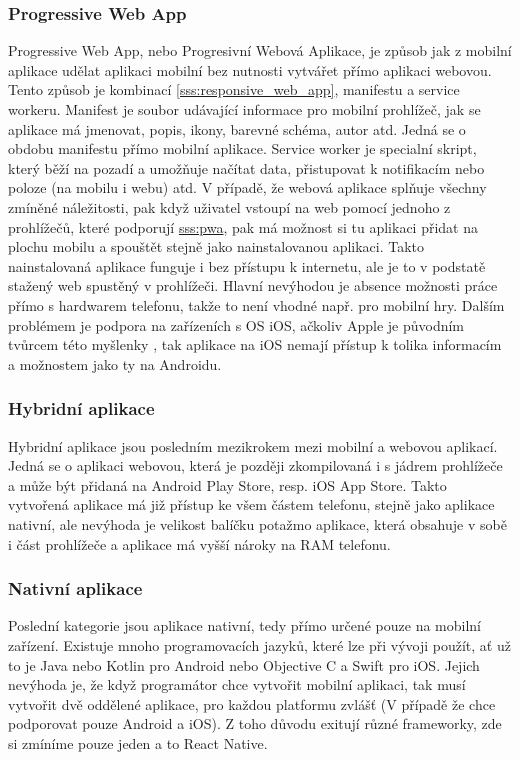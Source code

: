 \subsubsection*{Progressive Web App}
\label{sss:pwa}
Progressive Web App, nebo Progresivní Webová Aplikace, je způsob jak z mobilní aplikace udělat aplikaci mobilní bez nutnosti vytvářet přímo aplikaci webovou. Tento způsob je kombinací \ref{sss:responsive_web_app}, manifestu a service workeru. Manifest je soubor udávající informace pro mobilní prohlížeč, jak se aplikace má jmenovat, popis, ikony, barevné schéma, autor atd. Jedná se o obdobu manifestu přímo mobilní aplikace. Service worker je specialní skript, který běží na pozadí a umožňuje načítat data, přistupovat k notifikacím nebo poloze (na mobilu i webu) atd. V případě, že webová aplikace splňuje všechny zmíněné náležitosti, pak když uživatel vstoupí na web pomocí jednoho z prohlížečů, které podporují \hyperref[PWA]{sss:pwa}, pak má možnost si tu aplikaci přidat na plochu mobilu a spouštět stejně jako nainstalovanou aplikaci. Takto nainstalovaná aplikace funguje i bez přístupu k internetu, ale je to v podstatě stažený web spustěný v prohlížeči. Hlavní nevýhodou je absence možnosti práce přímo s hardwarem telefonu, takže to není vhodné např. pro mobilní hry. Dalším problémem je podpora na zařízeních s OS iOS, ačkoliv Apple je původním tvůrcem této myšlenky \cite{ritchie_2018_app}, tak aplikace na iOS nemají přístup k tolika informacím a možnostem jako ty na Androidu.

\subsubsection*{Hybridní aplikace}
Hybridní aplikace jsou posledním mezikrokem mezi mobilní a webovou aplikací. Jedná se o aplikaci webovou, která je později zkompilovaná i s jádrem prohlížeče a může být přidaná na Android Play Store, resp. iOS App Store. Takto vytvořená aplikace má již přístup ke všem částem telefonu, stejně jako aplikace nativní, ale nevýhoda je velikost balíčku potažmo aplikace, která obsahuje v sobě i část prohlížeče a aplikace má vyšší nároky na RAM telefonu.

\subsubsection*{Nativní aplikace}
Poslední kategorie jsou aplikace nativní, tedy přímo určené pouze na mobilní zařízení. Existuje mnoho programovacích jazyků, které lze při vývoji použít, ať už to je Java nebo Kotlin pro Android nebo Objective C a Swift pro iOS. Jejich nevýhoda je, že když programátor chce vytvořit mobilní aplikaci, tak musí vytvořit dvě oddělené aplikace, pro každou platformu zvlášť (V případě že chce podporovat pouze Android a iOS). Z toho důvodu exitují různé frameworky, zde si zmíníme pouze jeden a to React Native.

